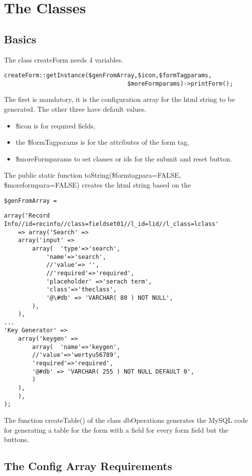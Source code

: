 \documentclass{article}
\begin{document}
\section{The Classes}

\subsection{Basics}
The class createForm needs 4 variables.

\begin{verbatim}
createForm::getInstance($genFromArray,$icon,$formTagparams,
                                   $moreFormparams)->printForm();
\end{verbatim}


The first is mandatory, it is the configuration array for the html string to be generated. 
The other three have default values.
\begin{itemize}
\item \$icon is for required fields,
\item the \$formTagparams is for the attributes of the form tag,
\item \$moreFormparams to set classes or ids for the submit and reset button.
\end{itemize}
The public static function toString(\$formtagpara=FALSE, \$moreformpara=FALSE) creates the html string 
based on the
\begin{verbatim}
$genFromArray =
\end{verbatim}
\begin{lstlisting}
array('Record Info//id=recinfo//class=fieldset01//l_id=lid//l_class=lclass' 
    => array('Search' =>
	array('input' =>
		array(	'type'=>'search',
			'name'=>'search',
			//'value'=> '',
			//'required'=>'required',
			'placeholder' =>'serach term',
			'class'=>'theclass',
			'@\#db' => 'VARCHAR( 80 ) NOT NULL',
		),
	),
...
'Key Generator' =>
	array('keygen' =>
		array(	'name'=>'keygen',
		//'value'=>'wertyu56789',
		'required'=>'required',
		'@#db' => 'VARCHAR( 255 ) NOT NULL DEFAULT 0',
		)
	),
    ),
);
\end{lstlisting}


The function createTable() of the class dbOperations generates the MySQL code for generating a table for the 
form with a field for every form field but the buttons.

\subsection{The Config Array Requirements}
\end{document}
